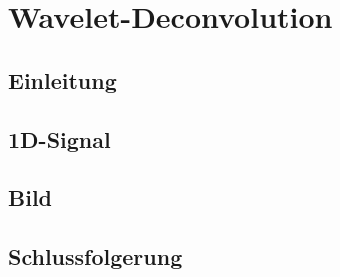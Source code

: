 %
%
%
\chapter{Wavelet-Deconvolution\label{chapter:deconvolve}}
\begin{refsection}

\section{Einleitung}


\section{1D-Signal}


\section{Bild}


\section{Schlussfolgerung}


\printbibliography[heading=subbibliography]
\end{refsection}
